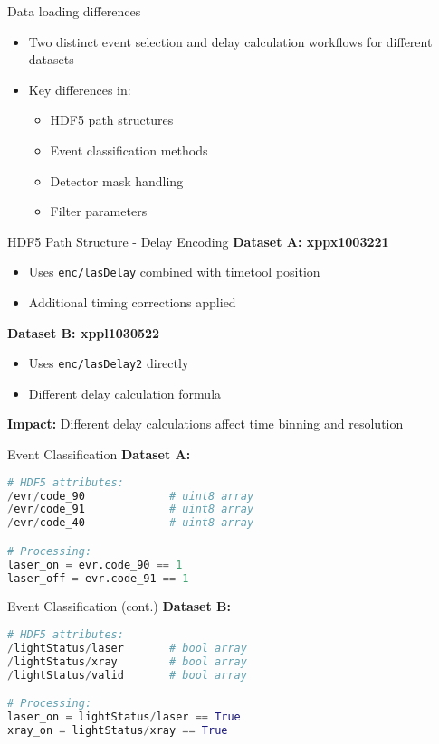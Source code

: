 \documentclass{beamer}
\begin{document}
\begin{frame}{Data loading differences}
\begin{itemize}
  \item Two distinct event selection and delay calculation workflows for different datasets
\item Key differences in:
    \begin{itemize}
    \item HDF5 path structures
    \item Event classification methods
    \item Detector mask handling
    \item Filter parameters
    \end{itemize}
\end{itemize}
\end{frame}

\begin{frame}{HDF5 Path Structure - Delay Encoding}
\textbf{Dataset A: xppx1003221}
\begin{itemize}
\item Uses \texttt{enc/lasDelay} combined with timetool position
\item Additional timing corrections applied
\end{itemize}

\textbf{Dataset B: xppl1030522}
\begin{itemize}
\item Uses \texttt{enc/lasDelay2} directly
\item Different delay calculation formula
\end{itemize}

\textbf{Impact:} Different delay calculations affect time binning and resolution
\end{frame}

\begin{frame}[fragile]{Event Classification}
\textbf{Dataset A:}
\begin{lstlisting}[language=Python]
# HDF5 attributes:
/evr/code_90             # uint8 array
/evr/code_91             # uint8 array
/evr/code_40             # uint8 array

# Processing:
laser_on = evr.code_90 == 1
laser_off = evr.code_91 == 1
\end{lstlisting}
\end{frame}

\begin{frame}[fragile]{Event Classification (cont.)}
\textbf{Dataset B:}
\begin{lstlisting}[language=Python]
# HDF5 attributes:
/lightStatus/laser       # bool array
/lightStatus/xray        # bool array
/lightStatus/valid       # bool array

# Processing:
laser_on = lightStatus/laser == True
xray_on = lightStatus/xray == True
\end{lstlisting}
\end{frame}
\end{document}
